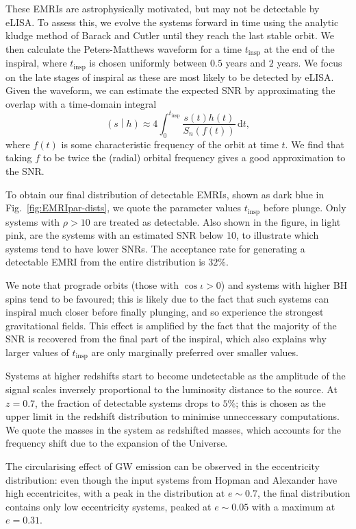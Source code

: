 \documentclass[aps,prd,amsfonts,amssymb,amsmath,nofootinbib,reprint,showpacs,superscriptaddress,twocolumn]{revtex4}
\newcommand{\figref}[1]{Fig.\ \ref{fig:#1}}
\newcommand{\dd}{\ensuremath{\mathrm{d}}}
\newcommand{\intd}[4]{\ensuremath{\int_{#1}^{#2}{#3}\,\dd{#4}}}
\newcommand{\overlap}[2]{\ensuremath{\left(#1\middle|#2\right)}}
\begin{document}
These EMRIs are astrophysically motivated, but may not be detectable by eLISA. To assess this, we evolve the systems forward in time using the analytic kludge method of Barack and Cutler \cite{Barack2004} until they reach the last stable orbit. We then calculate the Peters-Matthews waveform \cite{Peters1963} for a time $t_\mathrm{insp}$ at the end of the inspiral, where $t_\mathrm{insp}$ is chosen uniformly between $0.5$ years and $2$ years. We focus on the late stages of inspiral as these are most likely to be detected by eLISA. Given the waveform, we can estimate the expected SNR by approximating the overlap with a time-domain integral
\begin{equation}
\overlap{s}{h} \approx 4 \intd{0}{t_\mathrm{insp}}{\frac{s(t)h(t)}{S_n(f(t))}}{t},
\end{equation}
where $f(t)$ is some characteristic frequency of the orbit at time $t$. We find that taking $f$ to be twice the (radial) orbital frequency gives a good approximation to the SNR.

To obtain our final distribution of detectable EMRIs, shown as dark blue in \figref{EMRIpar-dists}, we quote the parameter values $t_\mathrm{insp}$ before plunge. Only systems with $\rho > 10$ are treated as detectable. Also shown in the figure, in light pink, are the systems with an estimated SNR below 10, to illustrate which systems tend to have lower SNRs. The acceptance rate for generating a detectable EMRI from the entire distribution is $32\%$.

We note that prograde orbits (those with $\cos\iota > 0$) and systems with higher BH spins tend to be favoured; this is likely due to the fact that such systems can inspiral much closer before finally plunging, and so experience the strongest gravitational fields. This effect is amplified by the fact that the majority of the SNR is recovered from the final part of the inspiral, which also explains why larger values of $t_\mathrm{insp}$ are only marginally preferred over smaller values.

Systems at higher redshifts start to become undetectable as the amplitude of the signal scales inversely proportional to the luminosity distance to the source. At $z=0.7$, the fraction of detectable systems drops to $5\%$; this is chosen as the upper limit in the redshift distribution to minimise unneccessary computations. We quote the masses in the system as redshifted masses, which accounts for the frequency shift due to the expansion of the Universe.

The circularising effect of GW emission can be observed in the eccentricity distribution: even though the input systems from Hopman and Alexander have high eccentricites, with a peak in the distribution at $e\sim0.7$, the final distribution contains only low eccentricity systems, peaked at $e\sim0.05$ with a maximum at $e=0.31$.
\end{document}
